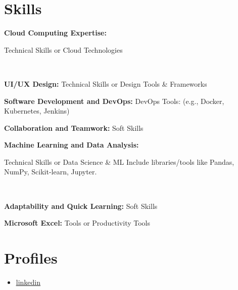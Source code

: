 \documentclass[letterpaper,11pt]{article}
\newcommand{\resumeItem}[1]{
  \item\small{
    {#1 \vspace{-2pt}}
  }
}
\newcommand{\resumeSubHeadingListStart}{\begin{itemize}[leftmargin=0.15in, label={}]}
\newcommand{\resumeSubHeadingListEnd}{\end{itemize}}
\newcommand{\resumeItemListStart}{\begin{itemize}}
\newcommand{\resumeItemListEnd}{\end{itemize}\vspace{-5pt}}
\begin{document}
\section{Skills}
  \vspace{2pt}
  \resumeSubHeadingListStart
    \small{\item{

  
    \textbf{Cloud Computing Expertise:}{ Technical Skills or Cloud Technologies

} \ \vspace{3pt}

    \textbf{UI/UX Design:}{ Technical Skills or Design Tools & Frameworks} \ \vspace{3pt}

    \textbf{Software Development and DevOps:}{ DevOps Tools: (e.g., Docker, Kubernetes, Jenkins)} \ \vspace{3pt}

    \textbf{Collaboration and Teamwork:}{ Soft Skills} \ \vspace{3pt}

    \textbf{ Machine Learning and Data Analysis:}{ Technical Skills or Data Science & ML
Include libraries/tools like Pandas, NumPy, Scikit-learn, Jupyter.

} \ \vspace{3pt}

    \textbf{ Adaptability and Quick Learning:}{ Soft Skills} \ \vspace{3pt}

    \textbf{ Microsoft Excel:}{  Tools or Productivity Tools} \ \vspace{3pt}

}}
\resumeSubHeadingListEnd




\section{Profiles}
  \vspace{2pt}
  \resumeItemListStart
  \resumeItem{\underline{\href{https://www.linkedin.com/in/akansha-kumari-9852b1282?utm_source=share&utm_campaign=share_via&utm_content=profile&utm_medium=android_app}{linkedin}}}
  \resumeItemListEnd

\end{document}
